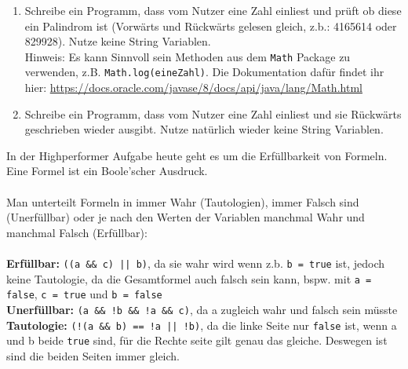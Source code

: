 \documentclass{../../sheet}
\begin{document}
\begin{enumerate}
    \item Schreibe ein Programm, dass vom Nutzer eine Zahl einliest und prüft ob diese ein Palindrom ist (Vorwärts und Rückwärts gelesen gleich, z.b.: 4165614 oder 829928). Nutze keine String Variablen.\\
    Hinweis: Es kann Sinnvoll sein Methoden aus dem \texttt{Math} Package zu verwenden, z.B. \texttt{Math.log(eineZahl)}. Die Dokumentation dafür findet ihr hier: \url{https://docs.oracle.com/javase/8/docs/api/java/lang/Math.html}
    \item Schreibe ein Programm, dass vom Nutzer eine Zahl einliest und sie Rückwärts geschrieben wieder ausgibt. Nutze natürlich wieder keine String Variablen.


\end{enumerate}

\newpage
{}
In der Highperformer Aufgabe heute geht es um die Erfüllbarkeit von Formeln. Eine Formel ist ein Boole'scher Ausdruck. 
\\\\
Man unterteilt Formeln in immer Wahr (Tautologien), immer Falsch sind (Unerfüllbar) oder je nach den Werten der Variablen manchmal Wahr und manchmal Falsch (Erfüllbar):
\\\\
\textbf{Erfüllbar: } \texttt{((a \&\& c) || b)}, da sie wahr wird wenn z.b. \texttt{b = true} ist, jedoch keine Tautologie, da die Gesamtformel auch falsch sein kann, bspw. mit \texttt{a = false}, \texttt{c = true} und \texttt{b = false}\\
\textbf{Unerfüllbar: } \texttt{(a \&\& !b \&\& !a \&\& c)}, da a zugleich wahr und falsch sein müsste\\
\textbf{Tautologie: } \texttt{(!(a \&\& b) == !a || !b)}, da die linke Seite nur \texttt{false} ist, wenn a und b beide \texttt{true} sind, für die Rechte seite gilt genau das gleiche. Deswegen ist sind die beiden Seiten immer gleich.
\end{document}
